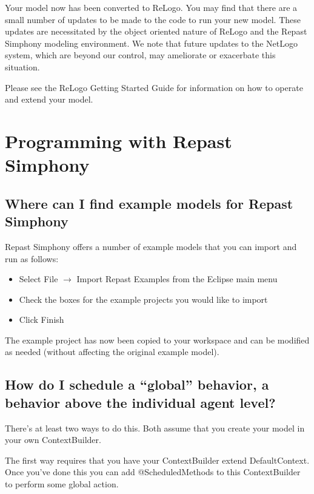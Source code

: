 \documentclass[11pt]{article}
\begin{document}
Your model now has been converted to ReLogo. You may find that there are a small number of updates to be made to the code to run your new model. These updates are necessitated by the object oriented nature of ReLogo and the Repast Simphony modeling environment. We note that future updates to the NetLogo system, which are beyond our control, may ameliorate or exacerbate this situation.

Please see the ReLogo Getting Started Guide for information on how to operate and extend your model.
\section{Programming with Repast Simphony}

\subsection{Where can I find example models for Repast Simphony}
\label{prs:examples}
Repast Simphony offers a number of example models that you can import and run as follows:
\begin{itemize}
\item Select File $\rightarrow$ Import Repast Examples from the Eclipse main menu
\item Check the boxes for the example projects you would like to import
\item Click Finish
\end{itemize}

The example project has now been copied to your workspace and can be modified as needed (without affecting the original example model).

\subsection{How do I schedule a ``global'' behavior, a behavior above the individual agent level?}
\label{prs:schedule_global}

There's at least two ways to do this. Both assume that you create your model in your own ContextBuilder.

The first way requires that you have your ContextBuilder extend DefaultContext. Once you've done this you can add @ScheduledMethods to this ContextBuilder to perform some global action.
\end{document}
